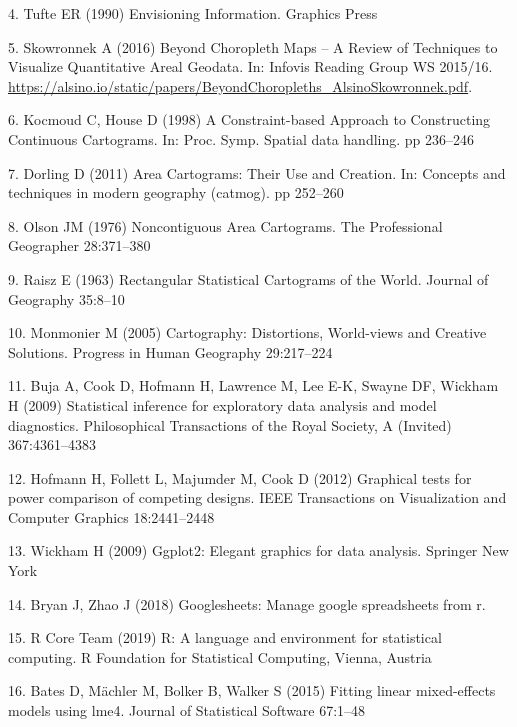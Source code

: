 \documentclass[conference,final,]{IEEEtran}
\begin{document}
\leavevmode\hypertarget{ref-EI}{}%
4. Tufte ER (1990) Envisioning Information. Graphics Press

\leavevmode\hypertarget{ref-BCM}{}%
5. Skowronnek A (2016) Beyond Choropleth Maps -- A Review of Techniques to Visualize Quantitative Areal Geodata. In: Infovis Reading Group WS 2015/16. \url{https://alsino.io/static/papers/BeyondChoropleths_AlsinoSkowronnek.pdf}.

\leavevmode\hypertarget{ref-CBATCC}{}%
6. Kocmoud C, House D (1998) A Constraint-based Approach to Constructing Continuous Cartograms. In: Proc. Symp. Spatial data handling. pp 236--246

\leavevmode\hypertarget{ref-ACTUC}{}%
7. Dorling D (2011) Area Cartograms: Their Use and Creation. In: Concepts and techniques in modern geography (catmog). pp 252--260

\leavevmode\hypertarget{ref-NAC}{}%
8. Olson JM (1976) Noncontiguous Area Cartograms. The Professional Geographer 28:371--380

\leavevmode\hypertarget{ref-RSCW}{}%
9. Raisz E (1963) Rectangular Statistical Cartograms of the World. Journal of Geography 35:8--10

\leavevmode\hypertarget{ref-CDWCS}{}%
10. Monmonier M (2005) Cartography: Distortions, World-views and Creative Solutions. Progress in Human Geography 29:217--224

\leavevmode\hypertarget{ref-BCHLLSW09}{}%
11. Buja A, Cook D, Hofmann H, Lawrence M, Lee E-K, Swayne DF, Wickham H (2009) Statistical inference for exploratory data analysis and model diagnostics. Philosophical Transactions of the Royal Society, A (Invited) 367:4361--4383

\leavevmode\hypertarget{ref-GTPCCD}{}%
12. Hofmann H, Follett L, Majumder M, Cook D (2012) Graphical tests for power comparison of competing designs. IEEE Transactions on Visualization and Computer Graphics 18:2441--2448

\leavevmode\hypertarget{ref-ggplot2}{}%
13. Wickham H (2009) Ggplot2: Elegant graphics for data analysis. Springer New York

\leavevmode\hypertarget{ref-sheets}{}%
14. Bryan J, Zhao J (2018) Googlesheets: Manage google spreadsheets from r.

\leavevmode\hypertarget{ref-RCore}{}%
15. R Core Team (2019) R: A language and environment for statistical computing. R Foundation for Statistical Computing, Vienna, Austria

\leavevmode\hypertarget{ref-lme4}{}%
16. Bates D, Mächler M, Bolker B, Walker S (2015) Fitting linear mixed-effects models using lme4. Journal of Statistical Software 67:1--48
\end{document}
